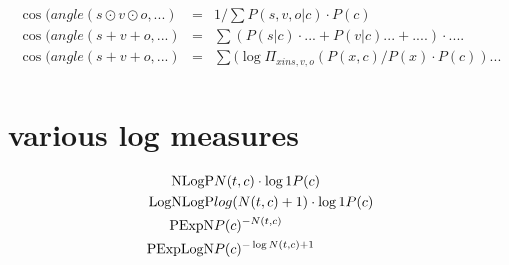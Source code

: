 \begin{eqnarray}
\cos(angle(s\odot v\odot o, ...) &=&  1/ \sum P(s,v,o|c) \cdot P(c)\\
\cos(angle(s+v+o, ...) &=& \sum (P(s|c)  \cdot  ... + P(v|c) ... + ....)  \cdot  ....\\
\cos(angle(s+v+o, ...) &=&  \sum (\log{\Pi_{x in s,v,o} (P(x,c)/P(x) \cdot P(c)) ...}\\
\end{eqnarray}

\section{various log measures}

\begin{eqnarray}
\textmd{NLogP}&   N(t,c)  \cdot \log{1}{P(c)}\\
\textmd{LogNLogP}&  log(N(t,c)+1) \cdot \log{1}{P(c)}\\
\textmd{PExpN}&    P(c)^{-N(t,c)}\\
\textmd{PExpLogN}& P(c)^{-\log{N(t,c)+1}}\\
\end{eqnarray}

